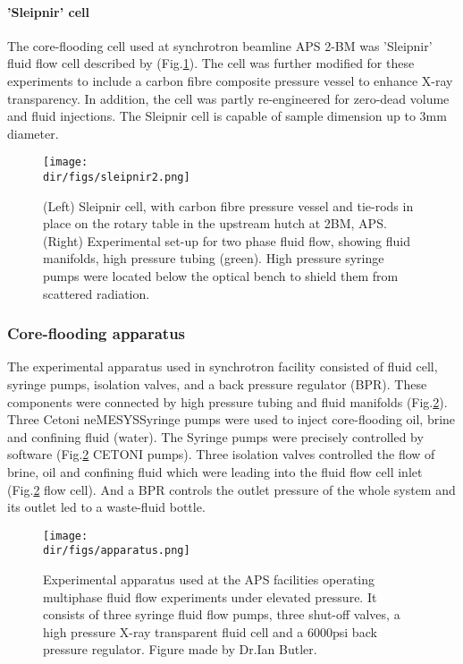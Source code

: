 \paragraph{'Sleipnir' cell}
The core-flooding cell used at synchrotron beamline APS 2-BM was 'Sleipnir' fluid flow cell described by \cite{fusseis2014low} (Fig.\ref{sleipnir2}). The cell was further modified for these experiments to include a carbon fibre composite pressure vessel to enhance X-ray transparency. In addition, the cell was partly re-engineered for zero-dead volume and fluid injections. The Sleipnir cell is capable of sample dimension up to 3mm diameter.

\begin{figure}[htbp]
  \centering
  \texttt{[image: \\dir/figs/sleipnir2.png]}
  \caption{(Left) Sleipnir cell, with carbon fibre pressure vessel and tie-rods in place on the rotary table in the upstream hutch at 2BM, APS. (Right) Experimental set-up for two phase fluid flow, showing fluid manifolds, high pressure tubing (green). High pressure syringe pumps were located below the optical bench to shield them from scattered radiation. }
  \label{sleipnir2}
\end{figure}

\subsubsection{Core-flooding apparatus}
The experimental apparatus used in synchrotron facility consisted of fluid cell, syringe pumps, isolation valves, and a back pressure regulator (BPR). These components were connected by high pressure tubing and fluid manifolds (Fig.\ref{apparatus}). Three Cetoni neMESYS\texttrademark Syringe pumps were used to inject core-flooding oil, brine and confining fluid (water). The Syringe pumps were precisely controlled by software (Fig.\ref{apparatus} CETONI pumps). Three isolation valves controlled the flow of brine, oil and confining fluid which were leading into the fluid flow cell inlet (Fig.\ref{apparatus} flow cell). And a BPR controls the outlet pressure of the whole system and its outlet led to a waste-fluid bottle. 

\begin{figure}[htbp]
  \centering
  \texttt{[image: \\dir/figs/apparatus.png]}
  \caption{ Experimental apparatus used at the APS facilities operating multiphase fluid flow experiments under elevated pressure. It consists of three syringe fluid flow pumps, three shut-off valves, a high pressure X-ray transparent fluid cell and a 6000psi back pressure regulator. Figure made by Dr.Ian Butler.}
  \label{apparatus}
\end{figure}

